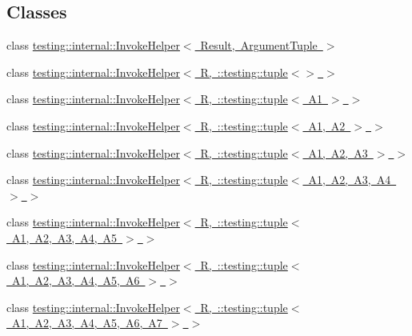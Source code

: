 \subsection*{Classes}
\begin{DoxyCompactItemize}
\item 
class \mbox{\hyperlink{classtesting_1_1internal_1_1InvokeHelper}{testing\+::internal\+::\+Invoke\+Helper$<$ Result, Argument\+Tuple $>$}}
\item 
class \mbox{\hyperlink{classtesting_1_1internal_1_1InvokeHelper_3_01R_00_01_1_1testing_1_1tuple_3_4_01_4}{testing\+::internal\+::\+Invoke\+Helper$<$ R, \+::testing\+::tuple$<$$>$ $>$}}
\item 
class \mbox{\hyperlink{classtesting_1_1internal_1_1InvokeHelper_3_01R_00_01_1_1testing_1_1tuple_3_01A1_01_4_01_4}{testing\+::internal\+::\+Invoke\+Helper$<$ R, \+::testing\+::tuple$<$ A1 $>$ $>$}}
\item 
class \mbox{\hyperlink{classtesting_1_1internal_1_1InvokeHelper_3_01R_00_01_1_1testing_1_1tuple_3_01A1_00_01A2_01_4_01_4}{testing\+::internal\+::\+Invoke\+Helper$<$ R, \+::testing\+::tuple$<$ A1, A2 $>$ $>$}}
\item 
class \mbox{\hyperlink{classtesting_1_1internal_1_1InvokeHelper_3_01R_00_01_1_1testing_1_1tuple_3_01A1_00_01A2_00_01A3_01_4_01_4}{testing\+::internal\+::\+Invoke\+Helper$<$ R, \+::testing\+::tuple$<$ A1, A2, A3 $>$ $>$}}
\item 
class \mbox{\hyperlink{classtesting_1_1internal_1_1InvokeHelper_3_01R_00_01_1_1testing_1_1tuple_3_01A1_00_01A2_00_01A3_00_01A4_01_4_01_4}{testing\+::internal\+::\+Invoke\+Helper$<$ R, \+::testing\+::tuple$<$ A1, A2, A3, A4 $>$ $>$}}
\item 
class \mbox{\hyperlink{classtesting_1_1internal_1_1InvokeHelper_3_01R_00_01_1_1testing_1_1tuple_3_01A1_00_01A2_00_01A3_00_01A4_00_01A5_01_4_01_4}{testing\+::internal\+::\+Invoke\+Helper$<$ R, \+::testing\+::tuple$<$ A1, A2, A3, A4, A5 $>$ $>$}}
\item 
class \mbox{\hyperlink{classtesting_1_1internal_1_1InvokeHelper_3_01R_00_01_1_1testing_1_1tuple_3_01A1_00_01A2_00_01A3_129338555c00c55487bfe9fa59e479ab}{testing\+::internal\+::\+Invoke\+Helper$<$ R, \+::testing\+::tuple$<$ A1, A2, A3, A4, A5, A6 $>$ $>$}}
\item 
class \mbox{\hyperlink{classtesting_1_1internal_1_1InvokeHelper_3_01R_00_01_1_1testing_1_1tuple_3_01A1_00_01A2_00_01A3_39d55f6ea73f4d04a19cf9b6bab3a605}{testing\+::internal\+::\+Invoke\+Helper$<$ R, \+::testing\+::tuple$<$ A1, A2, A3, A4, A5, A6, A7 $>$ $>$}}

\end{DoxyCompactItemize}

